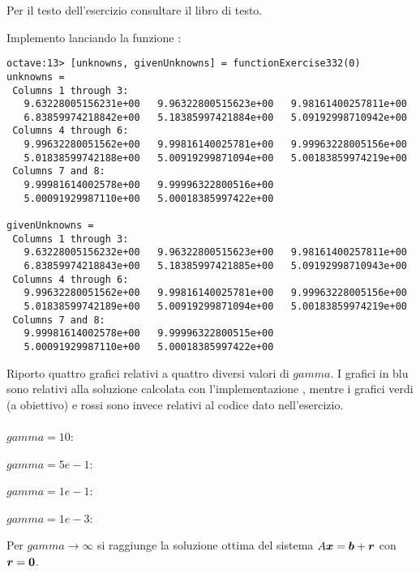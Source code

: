 \begin{exercise}[3.32]
Per il testo dell'esercizio consultare il libro di testo.
\end{exercise}
Implemento lanciando la funzione : 
\begin{lstlisting}
octave:13> [unknowns, givenUnknowns] = functionExercise332(0)
unknowns =
 Columns 1 through 3:
   9.63228005156231e+00   9.96322800515623e+00   9.98161400257811e+00
   6.83859974218842e+00   5.18385997421884e+00   5.09192998710942e+00
 Columns 4 through 6:
   9.99632280051562e+00   9.99816140025781e+00   9.99963228005156e+00
   5.01838599742188e+00   5.00919299871094e+00   5.00183859974219e+00
 Columns 7 and 8:
   9.99981614002578e+00   9.99996322800516e+00
   5.00091929987110e+00   5.00018385997422e+00

givenUnknowns =
 Columns 1 through 3:
   9.63228005156232e+00   9.96322800515623e+00   9.98161400257811e+00
   6.83859974218843e+00   5.18385997421885e+00   5.09192998710943e+00
 Columns 4 through 6:
   9.99632280051562e+00   9.99816140025781e+00   9.99963228005156e+00
   5.01838599742189e+00   5.00919299871094e+00   5.00183859974219e+00
 Columns 7 and 8:
   9.99981614002578e+00   9.99996322800515e+00
   5.00091929987110e+00   5.00018385997422e+00
\end{lstlisting}
Riporto quattro grafici relativi a quattro diversi valori di $gamma$.
I grafici in blu sono relativi alla soluzione calcolata con l'implementazione
, mentre i grafici verdi (a obiettivo) e rossi sono
invece relativi al codice dato nell'esercizio. 
\\\\
$gamma = 10$:
\begin{center}

\end{center}
$gamma = 5e-1$: 
\begin{center}

\end{center}
$gamma = 1e-1$:
\begin{center}

\end{center}
$gamma = 1e-3$:
\begin{center}

\end{center}
Per $gamma \rightarrow \infty$ si raggiunge la soluzione ottima del sistema
$A\boldsymbol{x} = \boldsymbol{b} + \boldsymbol{r}$ con $\boldsymbol{r} = \boldsymbol{0}$.
